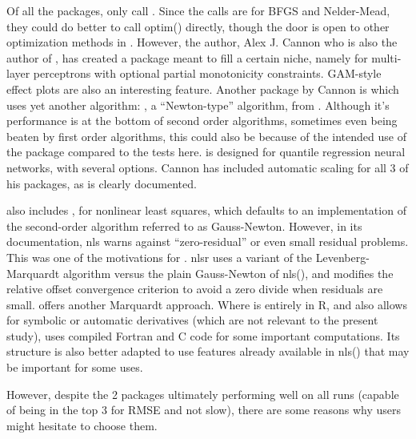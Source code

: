 Of all the packages, only  \citep{R-monmlp} call
. Since the calls are for BFGS and Nelder-Mead, they
could do better to call optim() directly, though the door is open to
other optimization methods in . However, the author,
Alex J. Cannon who is also the author of , has created
a package meant to fill a certain niche, namely for multi-layer
perceptrons with optional partial monotonicity constraints. GAM-style
effect plots are also an interesting feature. Another package by Cannon
is  \citep{R-qrnn} which uses yet another algorithm:
, a ``Newton-type'' algorithm, from .
Although it's performance is at the bottom of second order algorithms,
sometimes even being beaten by first order algorithms, this could also
be because of the intended use of the package compared to the tests
here.  is designed for quantile regression neural
networks, with several options. Cannon has included automatic scaling
for all 3 of his packages, as is clearly documented.

 also includes , for nonlinear least squares,
which defaults to an implementation of the second-order algorithm
referred to as Gauss-Newton. However, in its documentation, nls warns
against ``zero-residual'' or even small residual problems.
\citep[Section 6.4.1]{Nash-nlpor14} This was one of the motivations for
 \citep{R-nlsr}. nlsr uses a variant \citep{jn77ima} of
the Levenberg-Marquardt algorithm versus the plain Gauss-Newton of
nls(), and modifies the relative offset convergence criterion to avoid a
zero divide when residuals are small. 
\citep{minpack.lm} offers another Marquardt approach. Where
 is entirely in R, and also allows for symbolic or
automatic derivatives (which are not relevant to the present study),
 uses compiled Fortran and C code for some important
computations. Its structure is also better adapted to use features
already available in nls() that may be important for some uses.

However, despite the 2 packages ultimately performing well on all runs
(capable of being in the top 3 for RMSE and not slow), there are some
reasons why users might hesitate to choose them.

